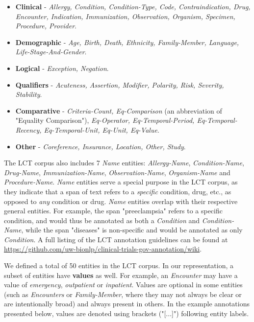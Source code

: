 \documentclass[../main.tex]{subfiles}
\begin{document}
\begin{itemize}
    \item \textbf{Clinical} - \textit{Allergy, Condition, Condition-Type, Code, Contraindication, Drug, Encounter, Indication, Immunization, Observation, Organism, Specimen, Procedure, Provider}. %
    \item \textbf{Demographic} - \textit{Age, Birth, Death, Ethnicity, Family-Member, Language, Life-Stage-And-Gender}. %
    \item \textbf{Logical} - \textit{Exception, Negation}. %
    \item \textbf{Qualifiers} - \textit{Acuteness, Assertion, Modifier, Polarity, Risk, Severity, Stability}. %
    \item \textbf{Comparative} - \textit{Criteria-Count, Eq-Comparison} (an abbreviation of "Equality Comparison"), \textit{Eq-Operator, Eq-Temporal-Period, Eq-Temporal-Recency, Eq-Temporal-Unit, Eq-Unit, Eq-Value}. %
    \item \textbf{Other} - \textit{Coreference, Insurance, Location, Other, Study}. %
\end{itemize}

The LCT corpus also includes 7 \textit{Name} entities: \textit{Allergy-Name}, \textit{Condition-Name}, \textit{Drug-Name}, \textit{Immunization-Name}, \textit{Observation-Name}, \textit{Organism-Name} and \textit{Procedure-Name}. \textit{Name} entities serve a special purpose in the LCT corpus, as they indicate that a span of text refers to a \textit{specific} condition, drug, etc., as opposed to \textit{any} condition or drug. \textit{Name} entities overlap with their respective general entities. For example, the span "preeclampsia" refers to a specific condition, and would thus be annotated as both a \textit{Condition} and \textit{Condition-Name}, while the span "diseases" is non-specific and would be annotated as only \textit{Condition}. A full listing of the LCT annotation guidelines can be found at \url{https://github.com/uw-bionlp/clinical-trials-gov-annotation/wiki}.

We defined a total of 50 entities in the LCT corpus. In our representation, a subset of entities have \textbf{values} as well. For example, an \textit{Encounter} may have a value of \textit{emergency}, \textit{outpatient} or \textit{inpatient}. Values are optional in some entities (such as \textit{Encounters} or \textit{Family-Member}, where they may not always be clear or are intentionally broad) and always present in others. In the example annotations presented below, values are denoted using brackets ("[...]") following entity labels.
\end{document}
